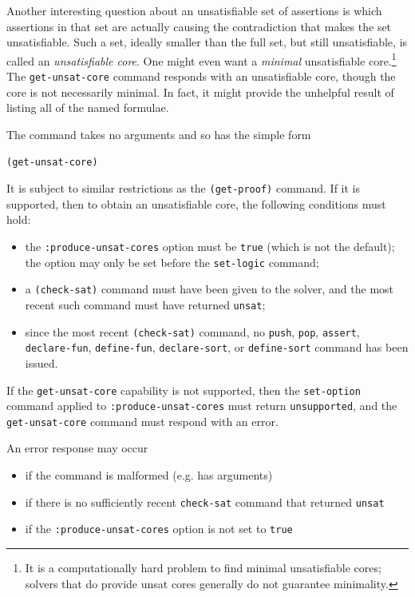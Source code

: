 \documentclass[12pt,oneside]{report}
\newcommand{\nospace}{\setlength{\itemsep}{0in}\setlength{\parsep}{0in}\setlength{\parskip}{0in}\setlength{\topsep}{0in}}
\begin{document}
Another interesting question about an unsatisfiable set of assertions is which assertions in
that set are actually causing the contradiction that makes the set unsatisfiable.
Such a set, ideally smaller than the full set, but still unsatisfiable, is called an
{\em unsatisfiable core}.  One might even want a {\em minimal} unsatisfiable core.\footnote{It is a computationally hard problem to find minimal unsatisfiable cores; solvers that do provide unsat cores generally do not guarantee minimality.}
The {\tt get-unsat-core} command responds with an unsatisfiable core, though the core is not necessarily minimal.  In fact, it might
provide the unhelpful result of listing all of the named formulae.

The command takes no arguments and so has the simple form\\
\centerline{\tt (get-unsat-core)}
It is subject to similar restrictions as
the {\tt (get-proof)} command.  If it is supported, then
to obtain an unsatisfiable core, the following conditions must hold:
\begin{itemize} \nospace
\item the {\tt :produce-unsat-cores} option must be {\tt true} (which is not the default); the option may only be set before the 
{\tt set-logic} command;
\item a {\tt (check-sat)} command must have been given to the solver, and the most
recent such command must have returned {\tt unsat};
\item since the most recent {\tt (check-sat)} command, no {\tt push}, {\tt pop},
{\tt assert}, {\tt declare-fun}, {\tt define-fun}, {\tt declare-sort}, or {\tt define-sort}
command has been issued.
\end{itemize}

If the {\tt get-unsat-core} capability is not supported, then the {\tt set-option} command applied to
{\tt :produce-unsat-cores} must return {\tt unsupported}, and the {\tt get-unsat-core} command must
respond with an error.

An error response may occur
\begin{itemize} \nospace
\item if the command is malformed (e.g. has arguments)
\item if there is no sufficiently recent {\tt check-sat} command that returned {\tt unsat}
\item if the {\tt :produce-unsat-cores} option is not set to {\tt true}
\end{itemize}
\end{document}
